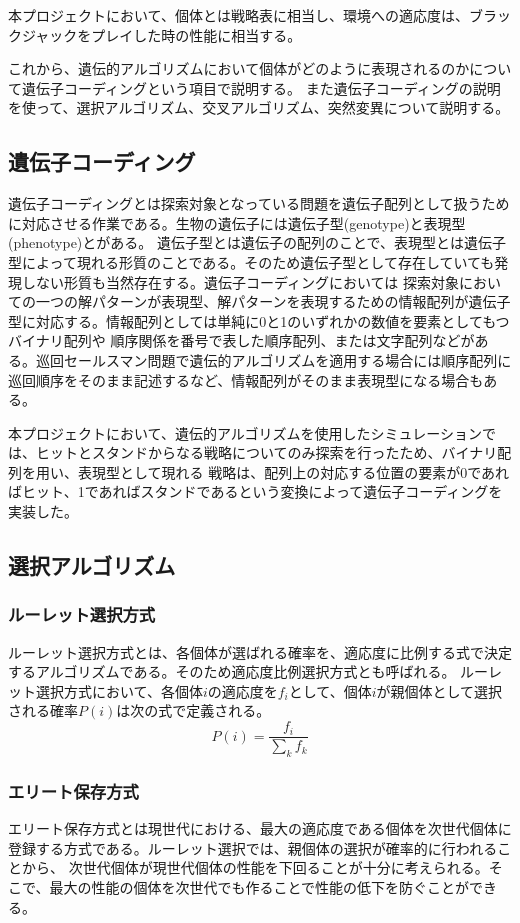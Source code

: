 本プロジェクトにおいて、個体とは戦略表に相当し、環境への適応度は、ブラックジャックをプレイした時の性能に相当する。

これから、遺伝的アルゴリズムにおいて個体がどのように表現されるのかについて遺伝子コーディングという項目で説明する。
また遺伝子コーディングの説明を使って、選択アルゴリズム、交叉アルゴリズム、突然変異について説明する。


\subsection{遺伝子コーディング}
遺伝子コーディングとは探索対象となっている問題を遺伝子配列として扱うために対応させる作業である。生物の遺伝子には遺伝子型(genotype)と表現型(phenotype)とがある。
遺伝子型とは遺伝子の配列のことで、表現型とは遺伝子型によって現れる形質のことである。そのため遺伝子型として存在していても発現しない形質も当然存在する。遺伝子コーディングにおいては
探索対象においての一つの解パターンが表現型、解パターンを表現するための情報配列が遺伝子型に対応する。情報配列としては単純に0と1のいずれかの数値を要素としてもつバイナリ配列や
順序関係を番号で表した順序配列、または文字配列などがある。巡回セールスマン問題で遺伝的アルゴリズムを適用する場合には順序配列に巡回順序をそのまま記述するなど、情報配列がそのまま表現型になる場合もある。

本プロジェクトにおいて、遺伝的アルゴリズムを使用したシミュレーションでは、ヒットとスタンドからなる戦略についてのみ探索を行ったため、バイナリ配列を用い、表現型として現れる
戦略は、配列上の対応する位置の要素が0であればヒット、1であればスタンドであるという変換によって遺伝子コーディングを実装した。

\subsection{選択アルゴリズム}
\subsubsection{ルーレット選択方式}
ルーレット選択方式とは、各個体が選ばれる確率を、適応度に比例する式で決定するアルゴリズムである。そのため適応度比例選択方式とも呼ばれる。
ルーレット選択方式において、各個体$i$の適応度を$f_i$として、個体$i$が親個体として選択される確率$P(i)$は次の式で定義される。
$$P(i) = \frac{f_i}{\sum_k f_k}$$
\subsubsection{エリート保存方式}
エリート保存方式とは現世代における、最大の適応度である個体を次世代個体に登録する方式である。ルーレット選択では、親個体の選択が確率的に行われることから、
次世代個体が現世代個体の性能を下回ることが十分に考えられる。そこで、最大の性能の個体を次世代でも作ることで性能の低下を防ぐことができる。

